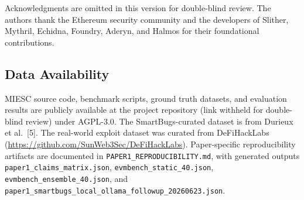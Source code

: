 \documentclass[conference]{IEEEtran}
\begin{document}
Acknowledgments are omitted in this version for double-blind review. The authors thank the Ethereum security community and the developers of Slither, Mythril, Echidna, Foundry, Aderyn, and Halmos for their foundational contributions.

\subsection*{Data Availability}

MIESC source code, benchmark scripts, ground truth datasets, and evaluation results are publicly available at the project repository (link withheld for double-blind review) under AGPL-3.0. The SmartBugs-curated dataset is from Durieux et al.~[5]. The real-world exploit dataset was curated from DeFiHackLabs (\url{https://github.com/SunWeb3Sec/DeFiHackLabs}). Paper-specific reproducibility artifacts are documented in \texttt{PAPER1\_REPRODUCIBILITY.md}, with generated outputs \texttt{paper1\_claims\_matrix.json}, \texttt{evmbench\_static\_40.json}, \texttt{evmbench\_ensemble\_40.json}, and \texttt{paper1\_smartbugs\_local\_ollama\_followup\_20260623.json}.

\end{document}
